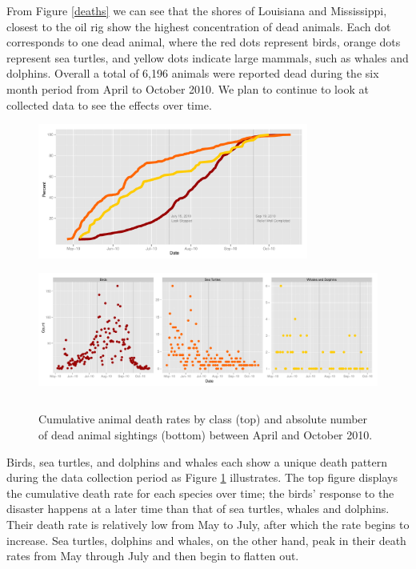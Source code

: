 \documentclass[authoryear,12pt]{elsarticle}
\begin{document}
{From Figure \ref{deaths} we can see that} the shores of Louisiana and Mississippi, closest to the oil rig show the highest concentration of dead animals. Each  {dot} corresponds to one dead  {animal, where} the red dots represent birds, orange dots  {represent} sea turtles, and yellow dots indicate large mammals, such as whales and dolphins. Overall a total of 6,196 animals were reported dead during  {the} six month period  {from April to October 2010}. We plan to continue to look at collected data to see the effects over time. 

	\begin{figure}[htbp] %
   \centering
   \includegraphics[height=1.75in]{death-rates.pdf} 
    \includegraphics[height=1.75in]{daily-death-counts.pdf}
   \caption{Cumulative animal death rates by class  (top) and absolute number of dead animal sightings (bottom) between April and October 2010.\newline}
   \label{death rates}
\end{figure}

Birds, sea turtles, and dolphins and whales  {each show a} unique death pattern during the data collection period as Figure \ref{death rates} illustrates. The  {top} figure  {displays the} cumulative death rate for each species over time; the {birds' response} to the disaster  happens at a {later} time than that of sea turtles, whales and dolphins.  {Their death rate is relatively low} from May to July, after which the rate beg{ins} to increase. Sea turtles, dolphins and whales, on the other hand, {peak in their} death rates from May  {through} July and  {then} begin to flatten out. \\
\end{document}
